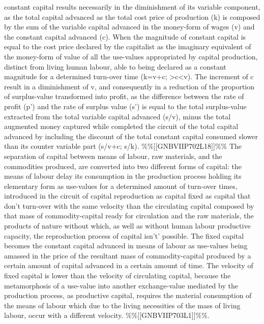 \documentclass[
]{article}
\begin{document}
constant capital results necessarily in the diminishment of its variable
component, as the total capital advanced as the total cost price of
production (k) is composed by the sum of the variable capital advanced
in the money-form of wages (v) and the constant capital advanced (c).
When the magnitude of constant capital is equal to the cost price
declared by the capitalist as the imaginary equivalent of the money-form
of value of all the use-values appropriated by capital production,
distinct from living human labour, able to being declared as a constant
magnitude for a determined turn-over time (k=v+c;
\textgreater c\textbar\textless v). The increment of c result in a
diminishment of v, and consequently in a reduction of the proportion of
surplus-value transformed into profit, as the difference between the
rate of profit (p') and the rate of surplus value (s') is equal to the
total surplus-value extracted from the total variable capital advanced
(s/v), minus the total augmented money captured while completed the
circuit of the total capital advanced by including the discount of the
total constant capital consumed slower than its counter variable part
(s/v+c; s/k). \%\%{[}{[}GNBVIIP702L18{]}{]}\%\% The separation of
capital between means of labour, raw materials, and the commodities
produced, are converted into two different forms of capital: the means
of labour delay its consumption in the production process holding its
elementary form as use-values for a determined amount of turn-over
times, introduced in the circuit of capital reproduction as capital
fixed as capital that don't turn-over with the same velocity than the
circulating capital composed by that mass of commodity-capital ready for
circulation and the raw materials, the products of nature without which,
as well as without human labour productive capacity, the reproduction
process of capital isn't' possible. The fixed capital becomes the
constant capital advanced in means of labour as use-values being amassed
in the price of the resultant mass of commodity-capital produced by a
certain amount of capital advanced in a certain amount of time. The
velocity of fixed capital is lower than the velocity of circulating
capital, because the metamorphosis of a use-value into another
exchange-value mediated by the production process, as productive
capital, requires the material consumption of the means of labour which
due to the living necessities of the mass of living labour, occur with a
different velocity. \%\%{[}{[}GNBVIIP703L1{]}{]}\%\%.
\end{document}

